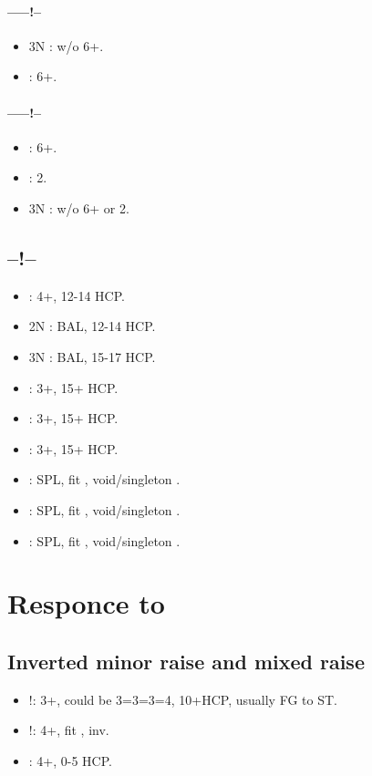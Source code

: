 \documentclass[12pt,twoside,a5paper]{report}%
\begin{document}
	\subsubsection*{------!--}
	\begin{itemize}
	\renewcommand{\labelitemi}{}
	\item 3N : w/o  6+\cl{}.
	\item {} : 6+\cl{}.
	\end{itemize}

	\subsubsection*{------!--}
	\begin{itemize}
	\renewcommand{\labelitemi}{}
	\item {} : 6+\cl{}.
	\item {} : 2\di{}.
	\item 3N : w/o  6+\cl{} or 2\di{}.
	\end{itemize}

	\section*{--!--}
	\begin{itemize}
	\renewcommand{\labelitemi}{}
	\item {} : 4+\cl{}, 12-14 HCP.
	\item 2N : BAL, 12-14 HCP.
	\item 3N : BAL, 15-17 HCP.
	\item {} : 3+\di{}, 15+ HCP.
	\item {} : 3+\he{}, 15+ HCP.
	\item {} : 3+\sp{}, 15+ HCP.
	\item {} : SPL, fit \cl{}, void/singleton \di{}.
	\item {} : SPL, fit \cl{}, void/singleton \he{}.
	\item {} : SPL, fit \cl{}, void/singleton \sp{}.
	\end{itemize}
	

\chapter*{Responce to }

	\section*{Inverted minor raise and mixed raise}
	\begin{itemize}
	\renewcommand{\labelitemi}{}
	\item {}!: 3+\di{}, could be 3=3=3=4, 10+HCP, usually FG to ST. 
	\item {}!: 4+\di{}, fit \di{}, inv.  
	\item {} : 4+\di{}, 0-5 HCP. 
	\end{itemize}
\end{document}

